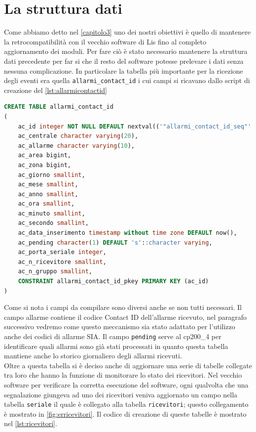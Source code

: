 \section{La struttura dati}
Come abbiamo detto nel \chaptername \ref{capitolo3} uno dei nostri obiettivi è quello di mantenere la retrocompatibilità con il vecchio software di Lis fino al completo aggiornamento dei moduli. Per fare ciò è stato necessario mantenere la struttura dati precedente per far si che il resto del software potesse prelevare i dati senza nessuna complicazione. In particolare la tabella più importante per la ricezione degli eventi era quella \texttt{allarmi\_contact\_id} i cui campi si ricavano dallo script di creazione del \lstname \ref{lst:allarmicontactid}
\begin{lstlisting}[language=SQL,caption=Tabella allarmi\_contact\_id,label=lst:allarmicontactid]
CREATE TABLE allarmi_contact_id
(
	ac_id integer NOT NULL DEFAULT nextval(('"allarmi_contact_id_seq"'::text)::regclass),
	ac_centrale character varying(20),
	ac_allarme character varying(10),
	ac_area bigint,
	ac_zona bigint,
	ac_giorno smallint,
	ac_mese smallint,
	ac_anno smallint,
	ac_ora smallint,
	ac_minuto smallint,
	ac_secondo smallint,
	ac_data_inserimento timestamp without time zone DEFAULT now(),
	ac_pending character(1) DEFAULT 's'::character varying,
	ac_porta_seriale integer,
	ac_n_ricevitore smallint,
	ac_n_gruppo smallint,
	CONSTRAINT allarmi_contact_id_pkey PRIMARY KEY (ac_id)
)
\end{lstlisting}
Come si nota i campi da compilare sono diversi anche se non tutti necessari. Il campo allarme contiene il codice Contact ID dell'allarme ricevuto, nel paragrafo successivo vedremo come questo meccanismo sia stato adattato per l'utilizzo anche dei codici di allarme SIA. Il campo \texttt{pending} serve al cp200\_4 per identificare quali allarmi sono già stati processati in quanto questa tabella mantiene anche lo storico giornaliero degli allarmi ricevuti.\\
Oltre a questa tabella si è deciso anche di aggiornare una serie di tabelle collegate tra loro che hanno la funzione di monitorare lo stato dei ricevitori. Nel vecchio software per verificare la corretta esecuzione del software, ogni qualvolta che una segnalazione giungeva ad uno dei ricevitori veniva aggiornato un campo nella tabella \texttt{seriale} il quale è collegato alla tabella \texttt{ricevitori}; questo collegamento è mostrato in \figurename \ref{fig:erricevitori}.
Il codice di creazione di queste tabelle è mostrato nel \lstname \ref{lst:ricevitori}.

